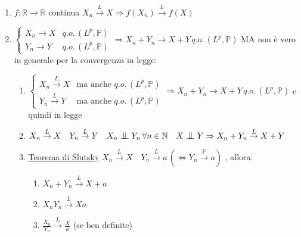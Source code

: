 \documentclass[openany]{book} %
\newcommand{\ind}{\mathrel{\text{\scalebox{1.07}{$\perp\mkern-10mu\perp$}}}}
\begin{document}
\begin{enumerate}

\item $f:\mathbb{R}\rightarrow \mathbb{R}$ continua $X_n \overset{L}{\rightarrow}X \Rightarrow f(X_n) \overset{L}{\rightarrow}f(X)$

\item $\left\{\begin{array}{ll}X_n \rightarrow X & q.o.\,(L^p,\mathbb{P})\\ Y_n \rightarrow Y & q.o.\,(L^p,\mathbb{P})\end{array} \right. \Rightarrow X_n+Y_n \rightarrow X+Y\,q.o.\,(L^p,\mathbb{P})$ MA non è vero in generale per la convergenza in legge:

\begin{enumerate}

\item $\left\{\begin{array}{ll}X_n \overset{L}\rightarrow X & \text{ma anche }q.o.\,(L^p,\mathbb{P})\\ Y_n\overset{L}\rightarrow Y & \text{ma anche }q.o.\,(L^p,\mathbb{P})\end{array} \right. \Rightarrow X_n+Y_n \rightarrow X+Y\,q.o.\,(L^p,\mathbb{P})$ e quindi in legge

\item $X_n \overset{L}\rightarrow X\quad Y_n \overset{L}\rightarrow Y\quad X_n\ind Y_n\,\forall n\in \mathbb{N}\quad X\ind Y \Rightarrow X_n+Y_n\overset{L}{\rightarrow}X+Y$

\item \underline{Teorema di Slutsky} $X_n \overset{L}\rightarrow X\quad Y_n \overset{L}\rightarrow a\, (\Leftrightarrow Y_n \overset{\mathbb{P}}{\rightarrow}a)$ , allora:

\begin{enumerate}

\item $X_n+Y_n \overset{L}{\rightarrow}X+a$

\item $X_nY_n \overset{L}{\rightarrow}Xa$

\item $\frac{X_n}{Y_n} \overset{L}{\rightarrow}\frac{X}{a}$ (se ben definite)

\end{enumerate}

\end{enumerate}

\end{enumerate}
\end{document}
